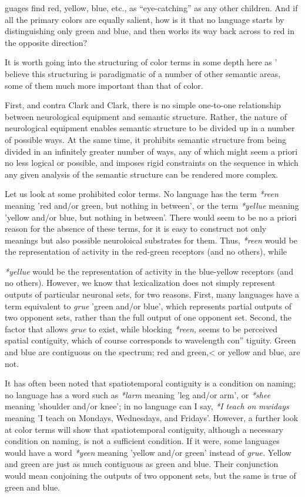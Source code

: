 
guages find red, yellow, blue, etc., as ``eye-catching'' as any other children. And if all the primary colors are equally salient, how is it that no language starts by distinguishing only green and blue, and then works its way back across to red in the opposite direction?

It is worth going into the structuring of color terms in some depth here as ' believe this structuring is paradigmatic of a number of other semantic areas, some of them much more important than that of color.

First, and contra Clark and Clark, there is no simple one-to-one relationship between neurological equipment and semantic structure. Rather, the nature of neurological equipment enables semantic struc\-ture to be divided up in a number of possible ways. At the same time, it prohibits semantic structure from being divided in an infinitely greater number of ways, any of which might seem a priori no less logical or possible, and imposes rigid constraints on the sequence in which any given analysis of the semantic structure can be rendered more complex.

Let us look at some prohibited color terms. No language has the term \textit{*reen} meaning 'red and/or green, but nothing in between', or the term \textit{*yellue} meaning 'yellow and/or blue, but nothing in between'. There would seem to be no a priori reason for the absence of these terms, for it is easy to construct not only meanings but also possible neuroloical substrates for them. Thus, \textit{*reen} would be the represen\-tation of activity in the red-green receptors (and no others), while

\textit{*yellue} would be the representation of activity in the blue-yellow receptors (and no others). However, we know that lexicalization does not simply represent outputs of particular neuronal sets, for two reasons. First, many languages have a term equivalent to \textit{grue} 'green and/or blue', which represents partial outputs of two opponent sets, rather than the full output of one opponent set. Second, the factor that allows \textit{grue} to exist, while blocking \textit{*reen,} seems to be perceived spatial contiguity, which of course corresponds to wavelength con'' tiguity. Green and blue are contiguous on the spectrum; red and green,{\textless} or yellow and blue, are not.


It has often been noted that spatiotemporal contiguity is a condition on naming; no language has a word such as \textit{*larm} meaning 'leg and/or arm', or \textit{*shee} meaning 'shoulder and/or knee'; in no lan\-guage can I say, \textit{*I} \textit{teach} \textit{on} \textit{mwidays} meaning 'I teach on Mondays, Wednesdays, and Fridays'. However, a further look at color terms will show that spatiotemporal contiguity, although a necessary condition on naming, is not a sufficient condition. If it were, some languages would have a word \textit{*yeen} meaning 'yellow and/or green' instead of \textit{grue.} Yellow and green are just as much contiguous as green and blue. Their conjunction would mean conjoining the outputs of two oppo\-nent sets, but the same is true of green and blue.

